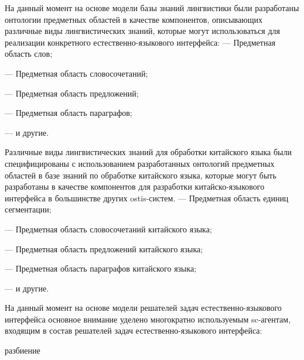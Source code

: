 На данный момент на основе модели базы знаний лингвистики были разработаны онтологии предметных областей в качестве компонентов, описывающих различные виды лингвистических знаний, которые могут использоваться для реализации конкретного естественно-языкового интерфейса:
— Предметная область слов;

— Предметная область словосочетаний;

— Предметная область предложений;

— Предметная область параграфов;

— и другие.

Различные виды лингвистических знаний для обработки китайского языка были специфицированы с использованием разработанных онтологий предметных областей в базе знаний по обработке китайского языка, которые могут быть разработаны в качестве компонентов для разработки китайско-языкового интерфейса в большинстве других ostis-систем.
— Предметная область единиц сегментации;

— Предметная область словосочетаний китайского языка;

— Предметная область предложений китайского языка;

— Предметная область параграфов китайского языка;

— и другие.

На данный момент на основе модели решателей задач естественно-языкового интерфейса основное внимание уделено многократно используемым sc-агентам, входящим в состав решателей задач естественно-языкового интерфейса:
\begin{SCn}
	\begin{scnrelfromset}{разбиение}
	\end{scnrelfromset}
\end{SCn}

